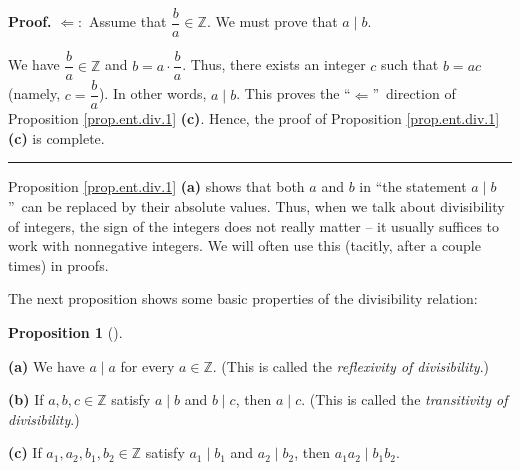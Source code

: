 \documentclass[numbers=enddot,12pt,final,onecolumn,notitlepage]{scrartcl}%
\numberwithin{exer}{subsection}
\theoremstyle{definition}
\newtheorem{prop}[theo]{Proposition}
\newenvironment{proposition}[1][]
{\begin{prop}[#1]\begin{leftbar}}
{\end{leftbar}\end{prop}}
\newenvironment{proof}[1][Proof]{\noindent\textbf{#1.} }{\ \rule{0.5em}{0.5em}}
\begin{document}
\begin{proof}
$\Longleftarrow:$ Assume that $\dfrac{b}{a}\in\mathbb{Z}$. We must prove that
$a\mid b$.

We have $\dfrac{b}{a}\in\mathbb{Z}$ and $b=a\cdot\dfrac{b}{a}$. Thus, there
exists an integer $c$ such that $b=ac$ (namely, $c=\dfrac{b}{a}$). In other
words, $a\mid b$. This proves the \textquotedblleft$\Longleftarrow
$\textquotedblright\ direction of Proposition \ref{prop.ent.div.1}
\textbf{(c)}. Hence, the proof of Proposition \ref{prop.ent.div.1}
\textbf{(c)} is complete.
\end{proof}

Proposition \ref{prop.ent.div.1} \textbf{(a)} shows that both $a$ and $b$ in
\textquotedblleft the statement $a\mid b$\textquotedblright\ can be replaced
by their absolute values. Thus, when we talk about divisibility of integers,
the sign of the integers does not really matter -- it usually suffices to work
with nonnegative integers. We will often use this (tacitly, after a couple
times) in proofs.

The next proposition shows some basic properties of the divisibility relation:

\begin{proposition}
\label{prop.ent.div.2}\textbf{(a)} We have $a\mid a$ for every $a\in
\mathbb{Z}$. (This is called the \textit{reflexivity of divisibility}.)

\textbf{(b)} If $a,b,c\in\mathbb{Z}$ satisfy $a\mid b$ and $b\mid c$, then
$a\mid c$. (This is called the \textit{transitivity of divisibility}.)

\textbf{(c)} If $a_{1},a_{2},b_{1},b_{2}\in\mathbb{Z}$ satisfy $a_{1}\mid
b_{1}$ and $a_{2}\mid b_{2}$, then $a_{1}a_{2}\mid b_{1}b_{2}$.
\end{proposition}
\end{document}
